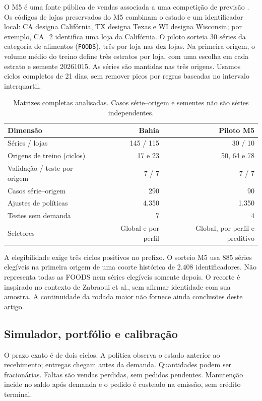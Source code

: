 \documentclass[preprint,12pt]{elsarticle}
\begin{document}
O M5 é uma fonte pública de vendas associada a uma competição de previsão \cite{Makridakis2022M5Accuracy}. Os códigos de lojas preservados do M5 combinam o estado e um identificador local: CA designa Califórnia, TX designa Texas e WI designa Wisconsin; por exemplo, CA\_2 identifica uma loja da Califórnia. O piloto sorteia 30 séries da categoria de alimentos (\texttt{FOODS}), três por loja nas dez lojas. Na primeira origem, o volume médio do treino define três estratos por loja, com uma escolha em cada estrato e semente 20261015. As séries são mantidas nas três origens. Usamos ciclos completos de 21 dias, sem remover picos por regras baseadas no intervalo interquartil.

\begin{table}[htbp]\centering\small
\caption{Matrizes completas analisadas. Casos série--origem e sementes não são séries independentes.}\label{tab:datasets}
\begin{tabular}{@{}lrr@{}}\toprule
Dimensão & Bahia & Piloto M5\\\midrule
Séries / lojas & 145 / 115 & 30 / 10\\
Origens de treino (ciclos) & 17 e 23 & 50, 64 e 78\\
Validação / teste por origem & 7 / 7 & 7 / 7\\
Casos série--origem & 290 & 90\\
Ajustes de políticas & 4.350 & 1.350\\
Testes sem demanda & 7 & 4\\
Seletores & Global e por perfil & Global, por perfil e preditivo\\\bottomrule
\end{tabular}\end{table}

A elegibilidade exige três ciclos positivos no prefixo. O sorteio M5 usa 885 séries elegíveis na primeira origem de uma coorte histórica de 2.408 identificadores. Não representa todas as FOODS nem séries elegíveis somente depois. O recorte é inspirado no contexto de Zabraoui et al., sem afirmar identidade com sua amostra. A continuidade da rodada maior não fornece ainda conclusões deste artigo.

\subsection{Simulador, portfólio e calibração}
O prazo exato é de dois ciclos. A política observa o estado anterior ao recebimento; entregas chegam antes da demanda. Quantidades podem ser fracionárias. Faltas são vendas perdidas, sem pedidos pendentes. Manutenção incide no saldo após demanda e o pedido é custeado na emissão, sem crédito terminal.
\end{document}
